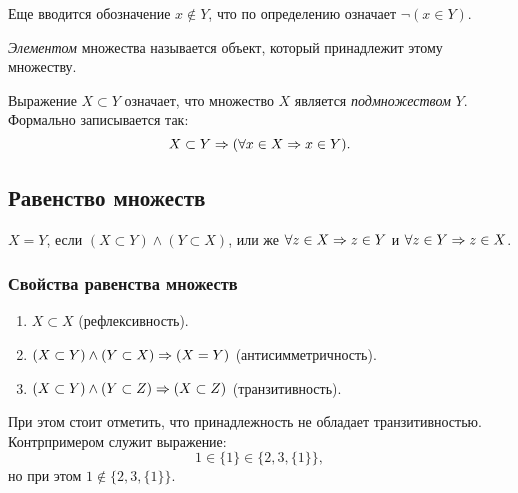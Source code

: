 \begin{multicols}{2}
    \begin{note}{}{}
      Еще вводится обозначение $x \notin Y$, что по определению означает $\neg (x \in Y)$.
    \end{note}
     
    \begin{definition}{}{}
        \textit{Элементом} множества называется объект, который принадлежит этому множеству.
    \end{definition}
     
    \begin{definition}{}{}
        Выражение $X \subset Y$ означает, что множество $X$ является \textit{подмножеством} $Y$. Формально записывается так:
        $$
            X \subset Y \Rightarrow (\forall x \in X \Rightarrow x \in Y).
        $$
    \end{definition}
     
    \subsection*{Равенство множеств}
     
    \begin{definition}{}{}
        $X = Y$, если $(X \subset Y) \wedge (Y \subset X)$, или же $\forall z \in X \Rightarrow z \in Y$ и $\forall z \in Y \Rightarrow z \in X$.
    \end{definition}
     
    \subsubsection*{Свойства равенства множеств}
     
    \begin{enumerate}
         \item $X \subset X$ (рефлексивность).
         \item $(X \subset Y) \wedge (Y \subset X) \Rightarrow (X = Y)$ (антисимметричность).
         \item $(X \subset Y) \wedge (Y \subset Z) \Rightarrow (X \subset Z)$ (транзитивность).
    \end{enumerate}
     
    \begin{note}{}{}
        При этом стоит отметить, что принадлежность не обладает транзитивностью. Контрпримером служит выражение:
        $$
            1 \in \{1\} \in \{2, 3, \{1\}\},
        $$
        но при этом $1 \notin \{2, 3, \{1\}\}$.
    \end{note}
     

\end{multicols}
